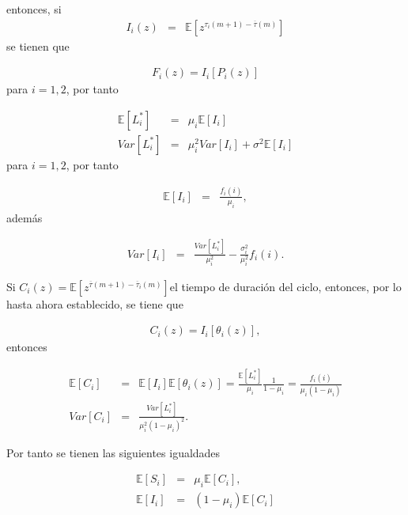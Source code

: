 \documentclass{article}
\newcommand{\esp}{\mathbb{E}}
\begin{document}
entonces, si \begin{eqnarray*}I_{i}\left(z\right)&=&\esp\left[z^{\tau_{i}\left(m+1\right)-\overline{\tau}\left(m\right)}\right]\end{eqnarray*} se tienen que

\begin{eqnarray*}
F_{i}\left(z\right)=I_{i}\left[P_{i}\left(z\right)\right]
\end{eqnarray*}
para $i=1,2$, por tanto



\begin{eqnarray*}
\esp\left[L_{i}^{*}\right]&=&\mu_{i}\esp\left[I_{i}\right]\\
Var\left[L_{i}^{*}\right]&=&\mu_{i}^{2}Var\left[I_{i}\right]+\sigma^{2}\esp\left[I_{i}\right]
\end{eqnarray*}
para $i=1,2$, por tanto


\begin{eqnarray*}
\esp\left[I_{i}\right]&=&\frac{f_{i}\left(i\right)}{\mu_{i}},
\end{eqnarray*}
adem\'as

\begin{eqnarray*}
Var\left[I_{i}\right]&=&\frac{Var\left[L_{i}^{*}\right]}{\mu_{i}^{2}}-\frac{\sigma_{i}^{2}}{\mu_{i}^{2}}f_{i}\left(i\right).
\end{eqnarray*}


Si  $C_{i}\left(z\right)=\esp\left[z^{\overline{\tau}\left(m+1\right)-\overline{\tau}_{i}\left(m\right)}\right]$el tiempo de duraci\'on del ciclo, entonces, por lo hasta ahora establecido, se tiene que

\begin{eqnarray*}
C_{i}\left(z\right)=I_{i}\left[\theta_{i}\left(z\right)\right],
\end{eqnarray*}
entonces

\begin{eqnarray*}
\esp\left[C_{i}\right]&=&\esp\left[I_{i}\right]\esp\left[\theta_{i}\left(z\right)\right]=\frac{\esp\left[L_{i}^{*}\right]}{\mu_{i}}\frac{1}{1-\mu_{i}}=\frac{f_{i}\left(i\right)}{\mu_{i}\left(1-\mu_{i}\right)}\\
Var\left[C_{i}\right]&=&\frac{Var\left[L_{i}^{*}\right]}{\mu_{i}^{2}\left(1-\mu_{i}\right)^{2}}.
\end{eqnarray*}

Por tanto se tienen las siguientes igualdades


\begin{eqnarray*}
\esp\left[S_{i}\right]&=&\mu_{i}\esp\left[C_{i}\right],\\
\esp\left[I_{i}\right]&=&\left(1-\mu_{i}\right)\esp\left[C_{i}\right]\\
\end{eqnarray*}
\end{document}
